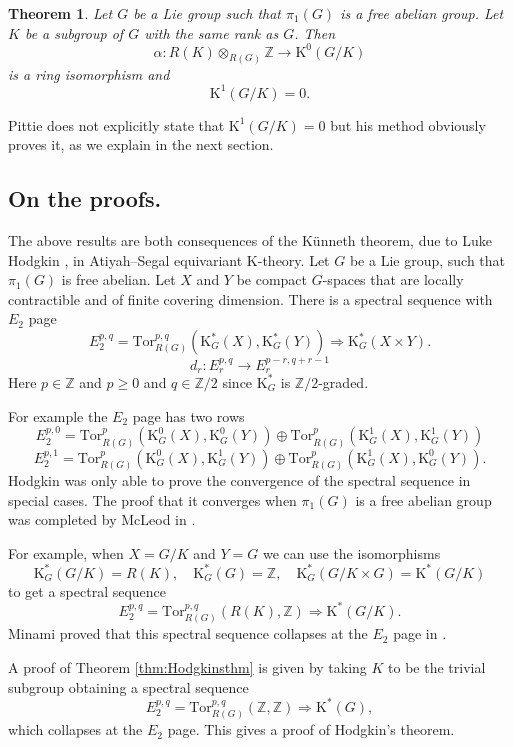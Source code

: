 \documentclass[twoside,a4paper,reqno,11pt]{amsart}
\newtheorem{theorem}[lemma]{Theorem}
\newcommand{\K}{\mathrm{K}}
\newcommand{\Z}{\mathbb{Z}}
\newcommand{\Tor}{\mathrm{Tor}}
\begin{document}
\begin{theorem} \label{thm:Pittiesthm}
Let $G$ be a Lie group such that $\pi_1(G)$ is a free abelian group. Let $K$ be a subgroup of $G$ with the same rank as $G$. Then
$$
\alpha : R(K)\otimes_{R(G)} \Z \to \K^0(G/K) 
$$
is a ring isomorphism and
$$
\K^1(G/K) = 0.
$$
\end{theorem}
Pittie does not explicitly state that $\K^1(G/K) = 0$ but his method obviously proves it, as we explain in the next section. 

\subsection{On the proofs.}
The above results are both consequences of the K\"{u}nneth theorem, due to Luke Hodgkin \cite[Theorem~1, p.4]{MR0478156}, in Atiyah--Segal equivariant $\K$-theory. Let $G$ be a Lie group, such that $\pi_1(G)$ is free abelian.  Let $X$ and $Y$ be compact $G$-spaces that are locally contractible and of finite covering dimension. There is a spectral sequence with $E_2$ page
$$
E_2^{p, q} = \Tor^{p,q}_{R(G)}(\K_G^*(X), \K_G^*(Y)) \Longrightarrow \K_G^*(X \times Y).
$$
$$
d_r : E_r^{p, q} \to E_r^{p-r, q+r-1}
$$
Here $p \in \Z$ and $p\geq 0$ and $q \in \Z/2$ since $\K_G^*$ is $\Z/2$-graded.  

For example the $E_2$ page has two rows
$$
E_2^{p,0} = \Tor^{p}_{R(G)}(\K_G^0(X), \K_G^0(Y)) \oplus \Tor^{p}_{R(G)}(\K_G^1(X), \K_G^1(Y))
$$
$$
E_2^{p,1} = \Tor^{p}_{R(G)}(\K_G^0(X), \K_G^1(Y)) \oplus \Tor^{p}_{R(G)}(\K_G^1(X), \K_G^0(Y)).
$$
Hodgkin was only able to prove the convergence of the spectral sequence in special cases. The proof that it converges when $\pi_1(G)$ is a free abelian group was completed by McLeod in \cite{MR0557175}. 

For example, when $X = G/K$ and $Y = G$  we can use the isomorphisms
$$
\K_G^*(G/K) = R(K),  \quad \K_G^*(G) = \Z, \quad  \K_G^{*}(G/K \times G) = \K^*(G/K)
$$ 
to get a spectral sequence
$$
E_2^{p,q} = \Tor^{p,q}_{R(G)}(R(K), \Z) \Longrightarrow  \K^*(G/K).
$$
Minami proved that this spectral sequence collapses at the $E_2$ page in \cite[Theorem~2.1]{MR415646}.

A proof of Theorem \ref{thm:Hodgkinsthm} is given by taking $K$ to be the trivial subgroup obtaining a spectral sequence 
$$
E_2^{p,q} = \Tor^{p,q}_{R(G)}(\Z, \Z) \Longrightarrow  \K^*(G),
$$
which collapses at the $E_2$ page. This gives a proof of Hodgkin's theorem. 
\end{document}
